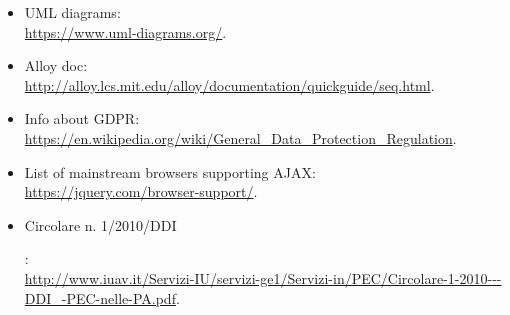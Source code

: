 \begin{itemize}
	\item UML diagrams:\\
	 \url{https://www.uml‐diagrams.org/}.
    \item Alloy doc:\\
     \url{http://alloy.lcs.mit.edu/alloy/documentation/quickguide/seq.html}.
    \item Info about GDPR:\\
    \url{https://en.wikipedia.org/wiki/General_Data_Protection_Regulation}.
    \item List of mainstream browsers supporting AJAX:\\
    \url{https://jquery.com/browser-support/}.
    \item \hypertarget{CircolarePEC}{Circolare n. 1/2010/DDI}:\\ \url{http://www.iuav.it/Servizi-IU/servizi-ge1/Servizi-in/PEC/Circolare-1-2010---DDI_-PEC-nelle-PA.pdf}.
\end{itemize}